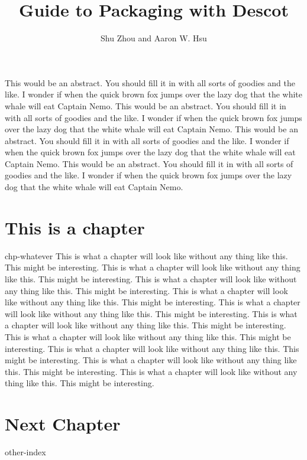 

\title{Guide to Packaging with Descot}
\author{Shu Zhou and Aaron W. Hsu}

\maketitlepage

\abstract
This would be an abstract. You should fill it in with all sorts of
goodies and the like. I wonder if when the quick brown fox jumps over
the lazy dog that the white whale will eat Captain Nemo. This would be an abstract. You should fill it in with all sorts of
goodies and the like. I wonder if when the quick brown fox jumps over
the lazy dog that the white whale will eat Captain Nemo. This would be an abstract. You should fill it in with all sorts of
goodies and the like. I wonder if when the quick brown fox jumps over
the lazy dog that the white whale will eat Captain Nemo. This would be an abstract. You should fill it in with all sorts of
goodies and the like. I wonder if when the quick brown fox jumps over
the lazy dog that the white whale will eat Captain Nemo. 
\endabstract

\chapter{This is a chapter}{chp-whatever}%
This is what a chapter will look like without any thing like this. This
might be interesting. This is what a chapter will look like without any thing like this. This
might be interesting. This is what a chapter will look like without any thing like this. This
might be interesting. This is what a chapter will look like without any thing like this. This
might be interesting. This is what a chapter will look like without any thing like this. This
might be interesting. This is what a chapter will look like without any thing like this. This
might be interesting. This is what a chapter will look like without any thing like this. This
might be interesting. This is what a chapter will look like without any thing like this. This
might be interesting. This is what a chapter will look like without any thing like this. This
might be interesting. This is what a chapter will look like without any thing like this. This
might be interesting.

\chapter{Next Chapter}{other-index}%

